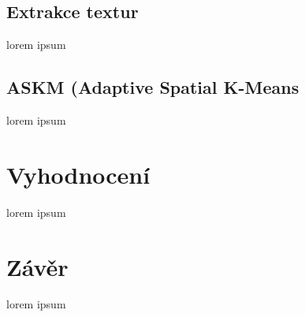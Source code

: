 \documentclass[fleqn,numbers=noenddot,headinclude,%
				11pt,a4paper,footinclude,%
				cleardoublepage=empty,abstractoff %
                ]{scrartcl}
\begin{document}
\subsection{Extrakce textur}
\label{sub:textury}
lorem ipsum

\subsection{ASKM (Adaptive Spatial K-Means}
\label{sub:askm}
lorem ipsum


\section{Vyhodnocení}
\label{sec:vyhodnoceni}
lorem ipsum

\section{Závěr}
\label{sec:zaver}
lorem ipsum
%
\end{document}
